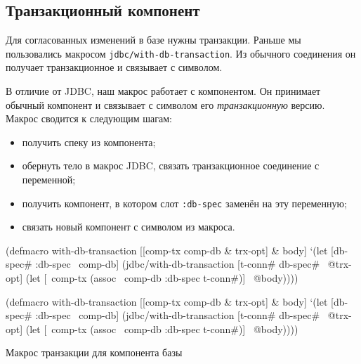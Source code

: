 \subsection{Транзакционный компонент}


Для согласованных изменений в базе нужны транзакции. Раньше мы пользовались
макросом \verb|jdbc/with-db-transaction|. Из обычного соединения он получает
транзакционное и связывает с символом.

В отличие от JDBC, наш макрос работает с компонентом. Он принимает обычный
компонент и связывает с символом его \emph{транзакционную} версию. Макрос
сводится к следующим шагам:

\begin{itemize}

\item
  получить спеку из компонента;

\item
  обернуть тело в макрос JDBC, связать транзакционное соединение с переменной;

\item
  получить компонент, в котором слот \verb|:db-spec| заменён на эту переменную;

\item
  связать новый компонент с символом из макроса.

\end{itemize}

\begin{listing}[ht!]

\ifx\DEVICETYPE\MOBILE

\begin{english}
  \begin{clojure}
(defmacro with-db-transaction
  [[comp-tx comp-db & trx-opt] & body]
  `(let [{db-spec# :db-spec} ~comp-db]
     (jdbc/with-db-transaction
       [t-conn# db-spec# ~@trx-opt]
       (let [~comp-tx
             (assoc ~comp-db
               :db-spec t-conn#)]
         ~@body))))
  \end{clojure}
\end{english}

\else

\begin{english}
  \begin{clojure}
(defmacro with-db-transaction
  [[comp-tx comp-db & trx-opt] & body]
  `(let [{db-spec# :db-spec} ~comp-db]
     (jdbc/with-db-transaction
       [t-conn# db-spec# ~@trx-opt]
       (let [~comp-tx (assoc ~comp-db :db-spec t-conn#)]
         ~@body))))
  \end{clojure}
\end{english}

\fi

\caption{Макрос транзакции для компонента базы}
\label{fig:trx-macro}

\end{listing}

